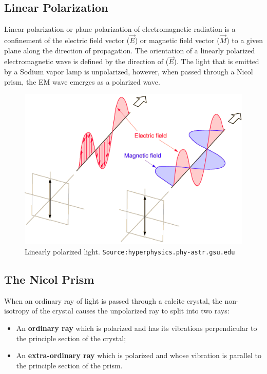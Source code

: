 \documentclass{dkpinto-report}
\begin{document}
\subsection{Linear Polarization}
Linear polarization or plane polarization of electromagnetic radiation is a confinement of the electric field vector ($\vec{E}$) or magnetic field vector ($\vec{M}$) to a given plane along the direction of propagation. The orientation of a linearly polarized electromagnetic wave is defined by the direction of ($\vec{E}$). The light that is emitted by a Sodium vapor lamp is unpolarized, however, when passed through a Nicol prism, the EM wave emerges as a polarized wave. 

\begin{figure}[h] %
\caption{Linearly polarized light. \texttt{Source:hyperphysics.phy-astr.gsu.edu}} %
\centering  %
\includegraphics[scale=0.4]{Images/Lin_Pol.png}
\end{figure}

\subsection{The Nicol Prism}
When an ordinary ray of light is passed through a calcite crystal, the non-isotropy of the crystal causes the unpolarized ray to split into two rays:

\begin{itemize} %
\item An \textbf{ordinary ray} which is polarized and has its vibrations perpendicular to the principle section of the crystal;
\item An \textbf{extra-ordinary ray} which is polarized and whose vibration is parallel to the principle section of the prism.
\end{itemize}
\end{document}
